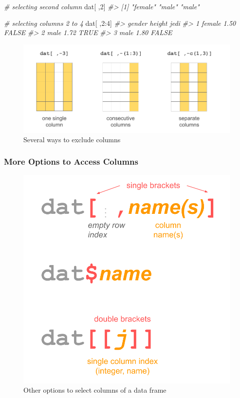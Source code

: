 \documentclass[
]{book}
\newenvironment{Shaded}{\begin{snugshade}}{\end{snugshade}}
\newcommand{\CommentTok}[1]{\textcolor[rgb]{0.56,0.35,0.01}{\textit{#1}}}
\newcommand{\DecValTok}[1]{\textcolor[rgb]{0.00,0.00,0.81}{#1}}
\newcommand{\NormalTok}[1]{#1}
\newcommand{\SpecialCharTok}[1]{\textcolor[rgb]{0.00,0.00,0.00}{#1}}
\begin{document}
\begin{Shaded}
\begin{Highlighting}[]
\CommentTok{\# selecting second column}
\NormalTok{dat[ ,}\DecValTok{2}\NormalTok{]}
\CommentTok{\#\textgreater{} [1] "female" "male"   "male"}

\CommentTok{\# selecting columns 2 to 4}
\NormalTok{dat[ ,}\DecValTok{2}\SpecialCharTok{:}\DecValTok{4}\NormalTok{]}
\CommentTok{\#\textgreater{}   gender height  jedi}
\CommentTok{\#\textgreater{} 1 female   1.50 FALSE}
\CommentTok{\#\textgreater{} 2   male   1.72  TRUE}
\CommentTok{\#\textgreater{} 3   male   1.80 FALSE}
\end{Highlighting}
\end{Shaded}

\begin{figure}

{\centering \includegraphics[width=0.8\linewidth]{images/objects/obj-dataframe-cols2} 

}

\caption{Several ways to exclude columns}\label{fig:unnamed-chunk-153}
\end{figure}

\hypertarget{more-options-to-access-columns}{%
\subsubsection*{More Options to Access Columns}\label{more-options-to-access-columns}}

\begin{figure}

{\centering \includegraphics[width=0.5\linewidth]{images/objects/obj-dataframe-names} 

}

\caption{Other options to select columns of a data frame}\label{fig:unnamed-chunk-154}
\end{figure}
\end{document}
